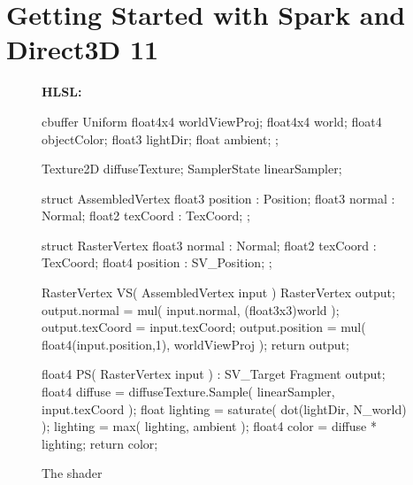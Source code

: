 \documentclass[]{report}
\newcommand{\codeblockheader}[1]{\textbf{\small #1: }}
\newenvironment{codeblockx}[1]%
{\begin{center}\begin{codebox} \codeblockheader{#1}}%
{\end{codebox}\end{center}}
\newcommand{\code}[1]{\text{\lstinline[style=spark_style]{#1}}}
\begin{document}
\chapter{Getting Started with Spark and Direct3D 11}

\begin{figure}
\begin{codeblockx}{HLSL}
\begin{hlsl}
cbuffer Uniform
{
    float4x4 worldViewProj;
    float4x4 world;
    float4   objectColor;
    float3   lightDir;
    float    ambient;
};

Texture2D    diffuseTexture;
SamplerState linearSampler;

struct AssembledVertex
{
    float3 position : Position;
    float3 normal   : Normal;
    float2 texCoord : TexCoord;
};

struct RasterVertex
{
    float3 normal   : Normal;
    float2 texCoord	: TexCoord;
    float4 position	: SV_Position;
};

RasterVertex VS( AssembledVertex input )
{
    RasterVertex output;
    output.normal = mul( input.normal, (float3x3)world );
    output.texCoord = input.texCoord;
    output.position = mul( float4(input.position,1), worldViewProj );
    return output;
}

float4 PS( RasterVertex input ) : SV_Target
{
    Fragment output;
    float4 diffuse = diffuseTexture.Sample( linearSampler,
                                            input.texCoord );
    float lighting = saturate( dot(lightDir, N_world) );
    lighting = max( lighting, ambient );
    float4 color = diffuse * lighting;
    return color;
}
\end{hlsl}
\end{codeblockx}
\caption{\label{fig:basichlsl}The \code{BasicHLSL11} shader}
\end{figure}
\end{document}
